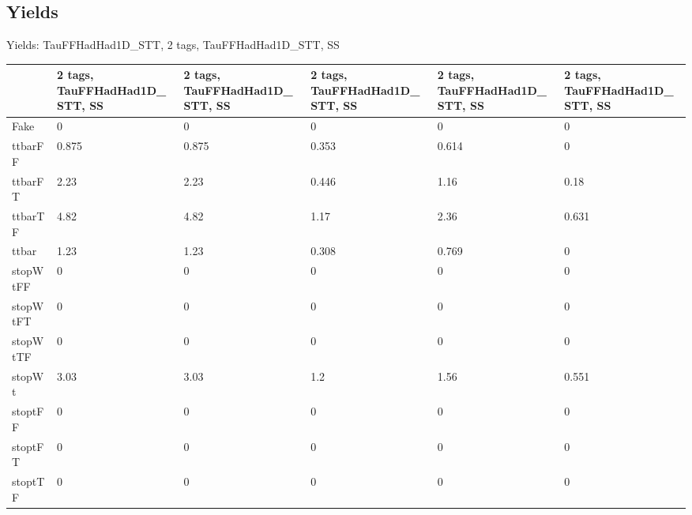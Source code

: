 
\subsection{Yields}

\begin{frame}{Yields: TauFFHadHad1D\_STT, 2 tags, TauFFHadHad1D\_STT, SS}
\begin{center}
  \begin{tabular}{l| >{\centering\let\newline\\\arraybackslash\hspace{0pt}}m{1.4cm}| >{\centering\let\newline\\\arraybackslash\hspace{0pt}}m{1.4cm}| >{\centering\let\newline\\\arraybackslash\hspace{0pt}}m{1.4cm}| >{\centering\let\newline\\\arraybackslash\hspace{0pt}}m{1.4cm}| >{\centering\let\newline\\\arraybackslash\hspace{0pt}}m{1.4cm}}
    & 2 tags, TauFFHadHad1D\_STT, SS & 2 tags, TauFFHadHad1D\_STT, SS & 2 tags, TauFFHadHad1D\_STT, SS & 2 tags, TauFFHadHad1D\_STT, SS & 2 tags, TauFFHadHad1D\_STT, SS \\
 \hline \hline
    Fake& 0 & 0 & 0 & 0 & 0 \\
 \hline
    ttbarFF& 0.875 & 0.875 & 0.353 & 0.614 & 0 \\
 \hline
    ttbarFT& 2.23 & 2.23 & 0.446 & 1.16 & 0.18 \\
 \hline
    ttbarTF& 4.82 & 4.82 & 1.17 & 2.36 & 0.631 \\
 \hline
    ttbar& 1.23 & 1.23 & 0.308 & 0.769 & 0 \\
 \hline
    stopWtFF& 0 & 0 & 0 & 0 & 0 \\
 \hline
    stopWtFT& 0 & 0 & 0 & 0 & 0 \\
 \hline
    stopWtTF& 0 & 0 & 0 & 0 & 0 \\
 \hline
    stopWt& 3.03 & 3.03 & 1.2 & 1.56 & 0.551 \\
 \hline
    stoptFF& 0 & 0 & 0 & 0 & 0 \\
 \hline
    stoptFT& 0 & 0 & 0 & 0 & 0 \\
 \hline
    stoptTF& 0 & 0 & 0 & 0 & 0 \\

\end{tabular}
\end{center}
\end{frame}
